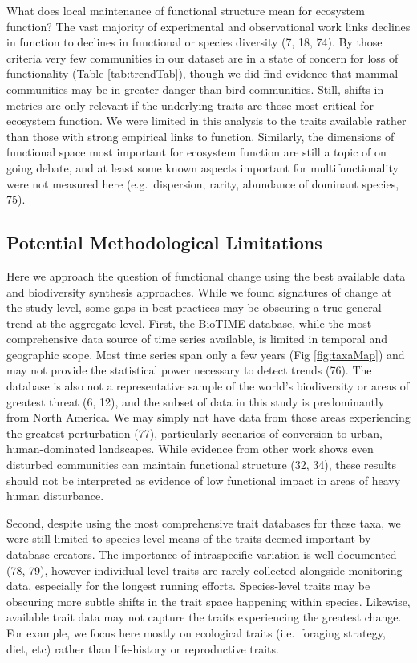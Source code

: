 \documentclass{article}
\begin{document}
What does local maintenance of functional structure mean for ecosystem
function? The vast majority of experimental and observational work links
declines in function to declines in functional or species diversity (7,
18, 74). By those criteria very few communities in our dataset are in a
state of concern for loss of functionality (Table \ref{tab:trendTab}),
though we did find evidence that mammal communities may be in greater
danger than bird communities. Still, shifts in metrics are only relevant
if the underlying traits are those most critical for ecosystem function.
We were limited in this analysis to the traits available rather than
those with strong empirical links to function. Similarly, the dimensions
of functional space most important for ecosystem function are still a
topic of on going debate, and at least some known aspects important for
multifunctionality were not measured here (e.g.~dispersion, rarity,
abundance of dominant species, 75).

\hypertarget{potential-methodological-limitations}{%
\subsection{Potential Methodological
Limitations}\label{potential-methodological-limitations}}

Here we approach the question of functional change using the best
available data and biodiversity synthesis approaches. While we found
signatures of change at the study level, some gaps in best practices may
be obscuring a true general trend at the aggregate level. First, the
BioTIME database, while the most comprehensive data source of time
series available, is limited in temporal and geographic scope. Most time
series span only a few years (Fig \ref{fig:taxaMap}) and may not provide
the statistical power necessary to detect trends (76). The database is
also not a representative sample of the world's biodiversity or areas of
greatest threat (6, 12), and the subset of data in this study is
predominantly from North America. We may simply not have data from those
areas experiencing the greatest perturbation (77), particularly
scenarios of conversion to urban, human-dominated landscapes. While
evidence from other work shows even disturbed communities can maintain
functional structure (32, 34), these results should not be interpreted
as evidence of low functional impact in areas of heavy human
disturbance.

Second, despite using the most comprehensive trait databases for these
taxa, we were still limited to species-level means of the traits deemed
important by database creators. The importance of intraspecific
variation is well documented (78, 79), however individual-level traits
are rarely collected alongside monitoring data, especially for the
longest running efforts. Species-level traits may be obscuring more
subtle shifts in the trait space happening within species. Likewise,
available trait data may not capture the traits experiencing the
greatest change. For example, we focus here mostly on ecological traits
(i.e.~foraging strategy, diet, etc) rather than life-history or
reproductive traits.
\end{document}
